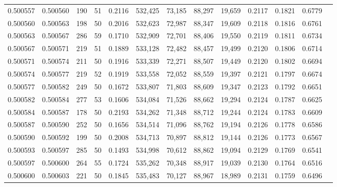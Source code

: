 \begin{tabular}{rrrrrrrrrrrrr}
0.500557 & 0.500560 & 190 &  51 &                                     0.2116 & 532,425 &  73,185 &  88,297 &  19,659 & 0.2117 & 0.1821 & 0.6779 \\
0.500560 & 0.500563 & 198 &  50 &                                     0.2016 & 532,623 &  72,987 &  88,347 &  19,609 & 0.2118 & 0.1816 & 0.6761 \\
0.500563 & 0.500567 & 286 &  59 &                                     0.1710 & 532,909 &  72,701 &  88,406 &  19,550 & 0.2119 & 0.1811 & 0.6734 \\
0.500567 & 0.500571 & 219 &  51 &                                     0.1889 & 533,128 &  72,482 &  88,457 &  19,499 & 0.2120 & 0.1806 & 0.6714 \\
0.500571 & 0.500574 & 211 &  50 &                                     0.1916 & 533,339 &  72,271 &  88,507 &  19,449 & 0.2120 & 0.1802 & 0.6694 \\
0.500574 & 0.500577 & 219 &  52 &                                     0.1919 & 533,558 &  72,052 &  88,559 &  19,397 & 0.2121 & 0.1797 & 0.6674 \\
0.500577 & 0.500582 & 249 &  50 &                                     0.1672 & 533,807 &  71,803 &  88,609 &  19,347 & 0.2123 & 0.1792 & 0.6651 \\
0.500582 & 0.500584 & 277 &  53 &                                     0.1606 & 534,084 &  71,526 &  88,662 &  19,294 & 0.2124 & 0.1787 & 0.6625 \\
0.500584 & 0.500587 & 178 &  50 &                                     0.2193 & 534,262 &  71,348 &  88,712 &  19,244 & 0.2124 & 0.1783 & 0.6609 \\
0.500587 & 0.500590 & 252 &  50 &                                     0.1656 & 534,514 &  71,096 &  88,762 &  19,194 & 0.2126 & 0.1778 & 0.6586 \\
0.500590 & 0.500592 & 199 &  50 &                                     0.2008 & 534,713 &  70,897 &  88,812 &  19,144 & 0.2126 & 0.1773 & 0.6567 \\
0.500593 & 0.500597 & 285 &  50 &                                     0.1493 & 534,998 &  70,612 &  88,862 &  19,094 & 0.2129 & 0.1769 & 0.6541 \\
0.500597 & 0.500600 & 264 &  55 &                                     0.1724 & 535,262 &  70,348 &  88,917 &  19,039 & 0.2130 & 0.1764 & 0.6516 \\
0.500600 & 0.500603 & 221 &  50 &                                     0.1845 & 535,483 &  70,127 &  88,967 &  18,989 & 0.2131 & 0.1759 & 0.6496 \\

\end{tabular}
